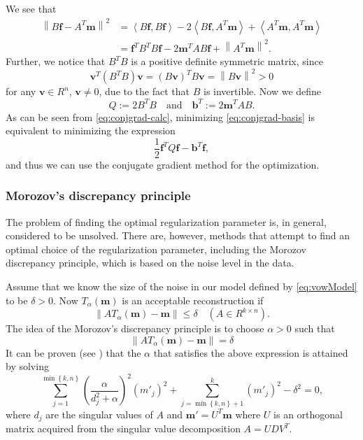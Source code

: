 \documentclass[12pt,a4]{article}
\newcommand{\lnorm}{\left\|}
\newcommand{\rnorm}{\right\|}
\newcommand{\vc}[1]{\ensuremath{\bm{#1}}}
\begin{document}
We see that
\begin{equation}
\label{eq:conjgrad-calc}
\begin{alignedat}{1}
\lnorm B \vc{f} - A^T \vc{m} \rnorm^2
  &= \left< B \vc{f}, B \vc{f} \right> - 2 \left< B \vc{f}, A^T \vc{m} \right> + \left< A^T \vc{m}, A^T \vc{m} \right> \\
  &= \vc{f}^T B^T B \vc{f} - 2 \vc{m}^T A B \vc{f} + \lnorm A^T \vc{m} \rnorm^2 .
\end{alignedat}
\end{equation}
Further, we notice that $B^T B$ is a positive definite symmetric matrix, since
\begin{equation*}
\vc{v}^T (B^T B) \vc{v} = (B \vc{v})^T B \vc{v} = \lnorm B \vc{v} \rnorm^2 > 0
\end{equation*}
for any $\vc{v} \in R^n$, $\vc{v} \neq 0$, due to the fact that $B$ is invertible. Now we define
\begin{equation*}
Q := 2 B^T B \quad \text{and} \quad \vc{b}^T := 2 \vc{m}^T A B .
\end{equation*}
As can be seen from \eqref{eq:conjgrad-calc}, minimizing \eqref{eq:conjgrad-basis} is equivalent to minimizing the expression
\begin{equation}
\frac{1}{2} \vc{f}^T Q \vc{f} - \vc{b}^T \vc{f} ,
\end{equation}
and thus we can use the conjugate gradient method for the optimization.



\subsubsection{Morozov's discrepancy principle}
The problem of finding the optimal regularization parameter is, in general, considered to be unsolved. There are, however, methods that attempt to find an optimal choice of the regularization parameter, including the Morozov discrepancy principle, which is based on the noise level in the data.

Assume that we know the size of the noise in our model defined by \eqref{eq:vowModel} to be $\delta > 0$. Now $T_\alpha( \vc{m} )$ is an acceptable reconstruction if 
\begin{equation}
\lnorm AT_\alpha( \vc{m} )- \vc{m} \rnorm \leq \delta \quad \left( A \in R^{k \times n}\right).
\end{equation}
The idea of the Morozov's discrepancy principle is to choose $\alpha > 0$ such that
\begin{equation}
\lnorm AT_\alpha( \vc{m} ) - \vc{m} \rnorm = \delta
\end{equation}
It can be proven (see \cite{samu}) that the $\alpha$ that satisfies the above expression is attained by solving
\begin{equation}\label{eq:morozov_root}
\sum_{j=1}^{\min\left\{ k,n \right\}} \left( \frac{\alpha}{d_j^2 + \alpha} \right)^2 \left( m'_j \right)^2 + \sum_{j = \min\left\{k,n\right\} + 1}^k \left( m'_j \right)^2 - \delta^2 = 0,
\end{equation}
where $d_j$ are the singular values of $A$ and $\vc{m'} = U^T \vc{m}$ where $U$ is an orthogonal matrix acquired from the singular value decomposition $A = U D V^T$.
\end{document}

